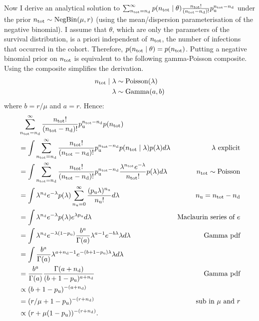 \documentclass[thesis.tex]{subfiles}
\begin{document}
Now I derive an analytical solution to $\sum_{n_\text{tot}=n_\text{d}}^\infty p(n_\text{tot} \mid \theta) \frac{n_\text{tot}!}{(n_\text{tot} - n_\text{d})!} p_\text{u}^{n_\text{tot} - n_\text{d}}$ under the prior $n_\text{tot} \sim \operatorname{NegBin}(\mu, r)$ (using the mean/dispersion parameterisation of the negative binomial).
I assume that $\theta$, which are only the parameters of the survival distribution, is a priori independent of $n_\text{tot}$, the number of infections that occurred in the cohort.
Therefore, $p(n_\text{tot} \mid \theta) = p(n_\text{tot})$.
Putting a negative binomial prior on $n_\text{tot}$ is equivalent to the following gamma-Poisson composite.
Using the composite simplifies the derivation.
\begin{align}
n_\text{tot} \mid \lambda &\sim \operatorname{Poisson}(\lambda) \\
\lambda &\sim \operatorname{Gamma}(a, b)
\end{align}
where $b = r / \mu$ and $a = r$.
Hence:
\begin{align}
&\sum_{n_\text{tot}=n_\text{d}}^\infty \frac{n_\text{tot}!}{(n_\text{tot}-n_\text{d})!} p_\text{u}^{n_\text{tot}-n_\text{d}} p(n_\text{tot}) \\
&= \int \sum_{n_\text{tot}=n_\text{d}}^\infty \frac{n_\text{tot}!}{(n_\text{tot}-n_\text{d})!} p_\text{u}^{n_\text{tot}-n_\text{d}} p(n_\text{tot} \mid \lambda) p(\lambda) d\lambda &\text{$\lambda$ explicit}\\
&= \int \sum_{n_\text{tot}=n_\text{d}}^\infty \frac{n_\text{tot}!}{(n_\text{tot}-n_\text{d})!} p_\text{u}^{n_\text{tot}-n_\text{d}} \frac{\lambda^{n_\text{tot}} e^{-\lambda}}{n_\text{tot}!} p(\lambda) d\lambda &n_\text{tot} \sim \operatorname{Poisson}\\
&= \int \lambda^{n_\text{d}} e^{-\lambda} p(\lambda) \sum_{n_\text{u}=0}^\infty \frac{(p_\text{u} \lambda)^{n_\text{u}}}{n_\text{u}!} d\lambda &n_\text{u} = n_\text{tot}-n_\text{d}\\
&= \int \lambda^{n_\text{d}} e^{-\lambda} p(\lambda) e^{\lambda p_\text{u}} d\lambda &\text{Maclaurin series of $e$} \\
&= \int \lambda^{n_\text{d}} e^{-\lambda(1 - p_\text{u})} \frac{b^a}{\Gamma(a)} \lambda^{a-1} e^{-b\lambda} \lambda d\lambda &\text{Gamma pdf}\\
&= \int \frac{b^a}{\Gamma(a)} \lambda^{a+n_\text{d}-1} e^{-(b+1-p_\text{u})\lambda} \lambda d\lambda \\
&= \frac{b^a}{\Gamma(a)} \frac{\Gamma(a+n_\text{d})}{(b+1-p_\text{u})^{a+n_\text{d}}} &\text{Gamma pdf}\\
&\propto (b+1-p_\text{u})^{-(a+n_\text{d})} \\
&= (r/\mu + 1 - p_\text{u})^{-(r+n_\text{d})} &\text{sub in $\mu$ and $r$}\\
&\propto(r + \mu (1- p_\text{u}))^{-(r+n_\text{d})}.
\end{align}
\end{document}
